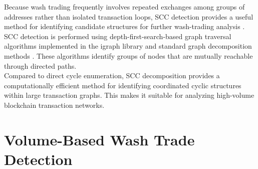 \documentclass[language=english,thesis=bachelor,nosecondtitle,faculty=cb,onesided,13pt]{hsmw-thesis}
\begin{document}
Because wash trading frequently involves repeated exchanges among groups of addresses rather than isolated transaction loops, SCC detection provides a useful method for identifying candidate structures for further wash-trading analysis \cite{cao2016detecting, victor2021detecting}.\\
SCC detection is performed using depth-first-search-based graph traversal algorithms implemented in the igraph library and standard graph decomposition methods \cite{sedgewick2011algorithms}. These algorithms identify groups of nodes that are mutually reachable through directed paths.\\
Compared to direct cycle enumeration, SCC decomposition provides a computationally efficient method for identifying coordinated cyclic structures within large transaction graphs. This makes it suitable for analyzing high-volume blockchain transaction networks.

\section{Volume-Based Wash Trade Detection}
\end{document}
